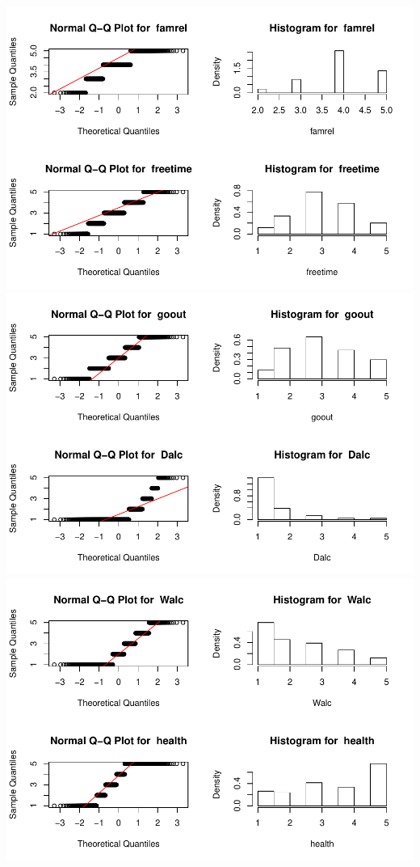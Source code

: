 \documentclass[]{article}
\begin{document}
\includegraphics{Practica2_files/figure-latex/unnamed-chunk-41-4.pdf}
\includegraphics{Practica2_files/figure-latex/unnamed-chunk-41-5.pdf}
\includegraphics{Practica2_files/figure-latex/unnamed-chunk-41-6.pdf}
\end{document}
